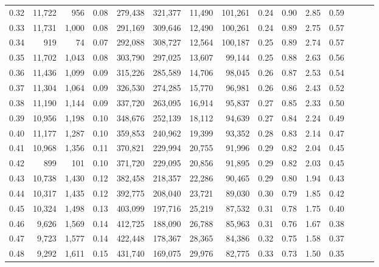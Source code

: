 \begin{tabular}{rrrrrrrrrrrrrrr}
0.32 &  11,722 &    956 &  0.08 &  279,438 &  321,377 &   11,490 &  101,261 &  0.24 &  0.90 &  2.85 &      0.59 \\
0.33 &  11,731 &  1,000 &  0.08 &  291,169 &  309,646 &   12,490 &  100,261 &  0.24 &  0.89 &  2.75 &      0.57 \\
0.34 &     919 &     74 &  0.07 &  292,088 &  308,727 &   12,564 &  100,187 &  0.25 &  0.89 &  2.74 &      0.57 \\
0.35 &  11,702 &  1,043 &  0.08 &  303,790 &  297,025 &   13,607 &   99,144 &  0.25 &  0.88 &  2.63 &      0.56 \\
0.36 &  11,436 &  1,099 &  0.09 &  315,226 &  285,589 &   14,706 &   98,045 &  0.26 &  0.87 &  2.53 &      0.54 \\
0.37 &  11,304 &  1,064 &  0.09 &  326,530 &  274,285 &   15,770 &   96,981 &  0.26 &  0.86 &  2.43 &      0.52 \\
0.38 &  11,190 &  1,144 &  0.09 &  337,720 &  263,095 &   16,914 &   95,837 &  0.27 &  0.85 &  2.33 &      0.50 \\
0.39 &  10,956 &  1,198 &  0.10 &  348,676 &  252,139 &   18,112 &   94,639 &  0.27 &  0.84 &  2.24 &      0.49 \\
0.40 &  11,177 &  1,287 &  0.10 &  359,853 &  240,962 &   19,399 &   93,352 &  0.28 &  0.83 &  2.14 &      0.47 \\
0.41 &  10,968 &  1,356 &  0.11 &  370,821 &  229,994 &   20,755 &   91,996 &  0.29 &  0.82 &  2.04 &      0.45 \\
0.42 &     899 &    101 &  0.10 &  371,720 &  229,095 &   20,856 &   91,895 &  0.29 &  0.82 &  2.03 &      0.45 \\
0.43 &  10,738 &  1,430 &  0.12 &  382,458 &  218,357 &   22,286 &   90,465 &  0.29 &  0.80 &  1.94 &      0.43 \\
0.44 &  10,317 &  1,435 &  0.12 &  392,775 &  208,040 &   23,721 &   89,030 &  0.30 &  0.79 &  1.85 &      0.42 \\
0.45 &  10,324 &  1,498 &  0.13 &  403,099 &  197,716 &   25,219 &   87,532 &  0.31 &  0.78 &  1.75 &      0.40 \\
0.46 &   9,626 &  1,569 &  0.14 &  412,725 &  188,090 &   26,788 &   85,963 &  0.31 &  0.76 &  1.67 &      0.38 \\
0.47 &   9,723 &  1,577 &  0.14 &  422,448 &  178,367 &   28,365 &   84,386 &  0.32 &  0.75 &  1.58 &      0.37 \\
0.48 &   9,292 &  1,611 &  0.15 &  431,740 &  169,075 &   29,976 &   82,775 &  0.33 &  0.73 &  1.50 &      0.35 \\

\end{tabular}
